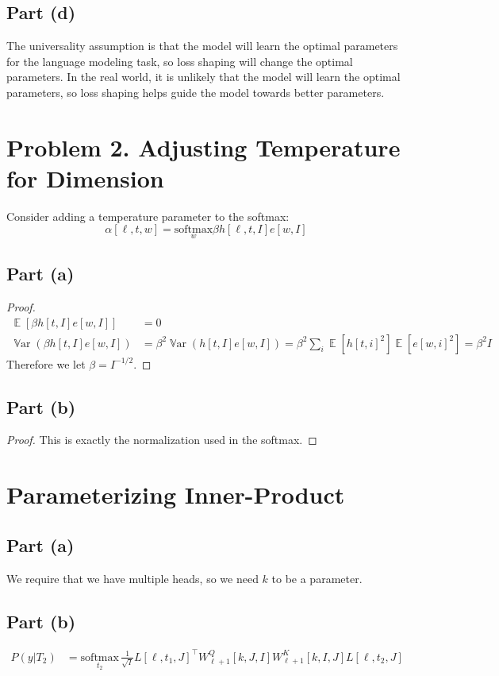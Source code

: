 \documentclass{amsart}
\DeclareMathOperator{\Var}{\mathbb{V}ar}  %
\DeclareMathOperator{\ee}{\mathbb{E}}
\theoremstyle{definition}
\begin{document}
\subsection*{Part (d)}
The universality assumption is that the model will learn the optimal parameters for the language modeling task,
so loss shaping will change the optimal parameters. 
In the real world, it is unlikely that the model will learn the optimal parameters, so loss shaping helps guide the model towards better parameters.

\section*{Problem 2. Adjusting Temperature for Dimension}
Consider adding a temperature parameter to the softmax:
\[
\alpha[\ell, t, w] = \underset{w}{\mathrm{softmax}} \beta h[\ell, t, I] e[w, I]
\]
\subsection*{Part (a)} 
\begin{proof}
    \begin{align*}
        \ee[\beta h[t, I] e[w, I]] &= 0 \\
        \Var(\beta h[t, I] e[w, I]) &= \beta^2 \Var(h[t, I] e[w, I])  = \beta^2 \sum_i \ee[h[t, i]^2] \ee[e[w, i]^2] = \beta^2 I
    \end{align*}
    Therefore we let $\beta = I^{-1/2}$. 
\end{proof}
\subsection*{Part (b)}
\begin{proof}
    This is exactly the normalization used in the softmax. 
\end{proof}

\section*{Parameterizing Inner-Product}

\subsection*{Part (a)}
We require that we have multiple heads, so we need $k$ to be a parameter. 
\subsection*{Part (b)}
\begin{align*}
    P(y | T_2) &= \underset{t_2}{\mathrm{softmax}}\,\frac{1}{\sqrt{I}} L[\ell, t_1, J]^\top W^Q_{\ell + 1}[k, J, I] W^K_{\ell + 1}[k, I, J] L[\ell, t_2, J] 
\end{align*}
\end{document}
